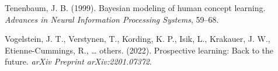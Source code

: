 \documentclass[10pt, letterpaper]{article}
\newenvironment{CSLReferences}%
  {}%
  {\par}
\begin{document}
\begin{CSLReferences}
\leavevmode{}%
Tenenbaum, J. B. (1999). Bayesian modeling of human concept learning.
\emph{Advances in Neural Information Processing Systems}, 59--68.

\leavevmode{}%
Vogelstein, J. T., Verstynen, T., Kording, K. P., Isik, L., Krakauer, J.
W., Etienne-Cummings, R., \ldots{} others. (2022). Prospective learning:
Back to the future. \emph{arXiv Preprint arXiv:2201.07372}.

\end{CSLReferences}


\end{document}
